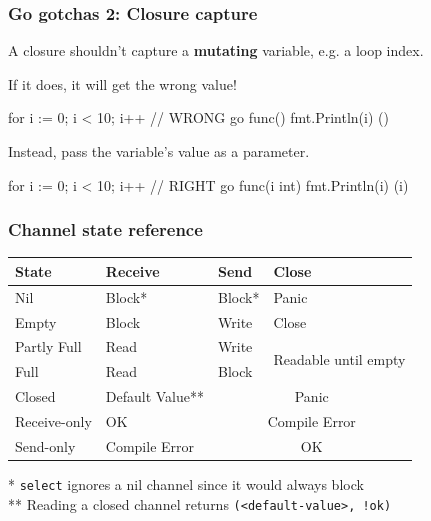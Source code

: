 \documentclass[compress,t,11pt]{beamer}
\begin{document}
\begin{frame}[fragile]
    \frametitle{Go gotchas 2: Closure capture}
    A closure shouldn't capture a {\bf mutating} variable, e.g. a loop index. \par
    \vspace{0.6\baselineskip}
    If it does, it will get the wrong value! \par
    \vspace{0.2\baselineskip}
\begin{golang}
for i := 0; i < 10; i++ {   // WRONG
    go func() {
        fmt.Println(i)
    }()
}
\end{golang}
    Instead, \alert{pass the variable's value as a parameter}.
    \vspace{0.2\baselineskip}
\begin{golang}
for i := 0; i < 10; i++ {  // RIGHT
    go func(i int) {
        fmt.Println(i)
    }(i)
}
\end{golang}
\end{frame}

\begin{frame}[fragile]
\frametitle{Channel state reference}
{\renewcommand{\arraystretch}{1.5}
\begin{table}[h!]
  \begin{center}
    \begin{tabular}{l||l|l|l}%
      \textbf{State} & \textbf{Receive}  & \textbf{Send} & \textbf{Close}\\
      \hline\hline
      Nil & Block* & Block* & Panic \\
      \hline
      Empty & Block & Write & Close \\
      \hline
      Partly Full & Read & Write & \multirow{2}{*}{Readable until empty} \\
      \cline{1-3}
      Full & Read & Block \\
      \hline
      Closed & Default Value** & \multicolumn{2}{c}{Panic} \\
      \hline\hline
      Receive-only & OK & \multicolumn{2}{c}{Compile Error} \\
      \hline
      Send-only & Compile Error & \multicolumn{2}{c}{OK} \\
    \end{tabular}
  \end{center}
\end{table}
}
{\footnotesize
  * \verb|select| ignores a nil channel since it would always block \\
  ** Reading a closed channel returns \verb|(<default-value>, !ok)|
}
\end{frame}
\end{document}
